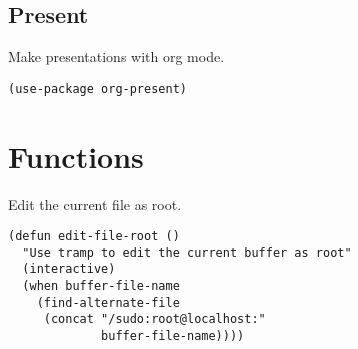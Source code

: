 \documentclass[11pt]{article}
\begin{document}
\subsection*{Present}
\label{sec:org9fda470}

Make presentations with org mode.

\begin{verbatim}
(use-package org-present)
\end{verbatim}

\section*{Functions}
\label{sec:org58bea50}

Edit the current file as root.

\begin{verbatim}
(defun edit-file-root ()
  "Use tramp to edit the current buffer as root"
  (interactive)
  (when buffer-file-name
    (find-alternate-file
     (concat "/sudo:root@localhost:"
             buffer-file-name))))
\end{verbatim}
\end{document}
